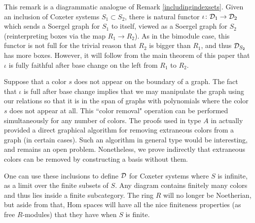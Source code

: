 \begin{remark} \label{SCnotfinite} This remark is a diagrammatic analogue of Remark \ref{includingindexsets}. Given an inclusion of Coxeter systems $S_1 \subset S_2$, there is natural
functor $\iota \colon {\mathcal{D}}_1 \rightarrow {\mathcal{D}}_2$ which sends a Soergel graph for $S_1$ to itself, viewed as a Soergel graph for $S_2$ (reinterpreting boxes via the map $R_1 \to R_2$). As in the
bimodule case, this functor is not full for the trivial reason that $R_2$ is bigger than $R_1$, and thus ${\mathcal{D}}_{S_2}$ has more boxes. However, it will follow from the main theorem of this
paper that $\iota$ is fully faithful after base change on the left from $R_{1}$ to $R_{2}$.

Suppose that a color $s$ does not appear on the boundary of a graph. The fact that $\iota$ is full after base change implies that we may manipulate the graph using our relations so that it
is in the span of graphs with polynomials where the color $s$ does not appear at all. This ``color removal" operation can be performed simultaneously for any number of colors. The proofs
used in type $A$ in \cite{EKh} actually provided a direct graphical algorithm for removing extraneous colors from a graph (in certain cases). Such an algorithm in general type would be
interesting, and remains an open problem. Nonetheless, we prove indirectly that extraneous colors can be removed by constructing a basis without them.

One can use these inclusions to define ${\mathcal{D}}$ for Coxeter systems where $S$ is infinite, as a limit over the finite subsets of $S$. Any diagram contains finitely many colors and thus lies
inside a finite subcategory. The ring $R$ will no longer be Noetherian, but aside from that, Hom spaces will have all the nice finiteness properties (as free $R$-modules) that they have
when $S$ is finite. \end{remark}

